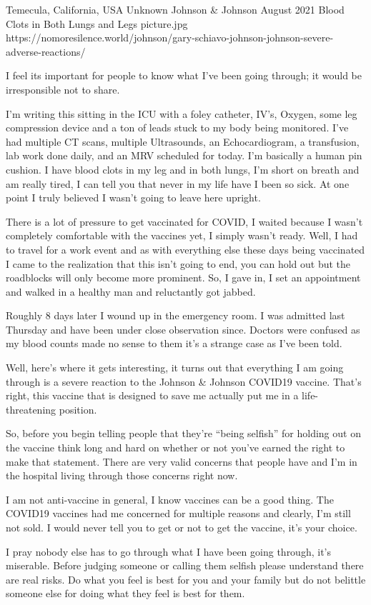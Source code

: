 {Temecula, California, USA}
{Unknown}
{Johnson \& Johnson}
{August 2021}
{Blood Clots in Both Lungs and Legs}
{picture.jpg}
{https://nomoresilence.world/johnson/gary-schiavo-johnson-johnson-severe-adverse-reactions/}
{


I feel its important for people to know what I’ve been going through; it would be irresponsible not to share.


I’m writing this sitting in the ICU with a foley catheter, IV’s, Oxygen, some leg compression device and a ton of leads stuck to my body being monitored. I’ve had multiple CT scans, multiple Ultrasounds, an Echocardiogram, a transfusion, lab work done daily, and an MRV scheduled for today. I’m basically a human pin cushion. I have blood clots in my leg and in both lungs, I’m short on breath and am really tired, I can tell you that never in my life have I been so sick. At one point I truly believed I wasn’t going to leave here upright.

There is a lot of pressure to get vaccinated for COVID, I waited because I wasn’t completely comfortable with the vaccines yet, I simply wasn’t ready. Well, I had to travel for a work event and as with everything else these days being vaccinated I came to the realization that this isn’t going to end, you can hold out but the roadblocks will only become more prominent. So, I gave in, I set an appointment and walked in a healthy man and reluctantly got jabbed.


Roughly 8 days later I wound up in the emergency room. I was admitted last Thursday and have been under close observation since. Doctors were confused as my blood counts made no sense to them it’s a strange case as I’ve been told.


Well, here’s where it gets interesting, it turns out that everything I am going through is a severe reaction to the Johnson \& Johnson COVID19 vaccine. That’s right, this vaccine that is designed to save me actually put me in a life-threatening position.


So, before you begin telling people that they’re “being selfish” for holding out on the vaccine think long and hard on whether or not you’ve earned the right to make that statement. There are very valid concerns that people have and I’m in the hospital living through those concerns right now.


I am not anti-vaccine in general, I know vaccines can be a good thing. The COVID19 vaccines had me concerned for multiple reasons and clearly, I’m still not sold. I would never tell you to get or not to get the vaccine, it’s your choice.

I pray nobody else has to go through what I have been going through, it’s miserable. Before judging someone or calling them selfish please understand there are real risks. Do what you feel is best for you and your family but do not belittle someone else for doing what they feel is best for them.
}
